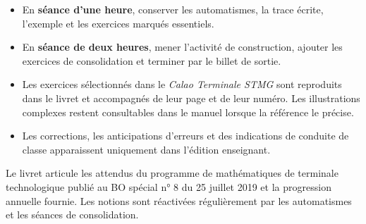 \documentclass[11pt,a4paper,openany]{book}
\begin{document}
\begin{itemize}
\item En \textbf{séance d'une heure}, conserver les automatismes, la trace écrite, l'exemple et les exercices marqués essentiels.
\item En \textbf{séance de deux heures}, mener l'activité de construction, ajouter les exercices de consolidation et terminer par le billet de sortie.
\item Les exercices sélectionnés dans le \emph{Calao Terminale STMG} sont reproduits dans le livret et accompagnés de leur page et de leur numéro. Les illustrations complexes restent consultables dans le manuel lorsque la référence le précise.
\item Les corrections, les anticipations d'erreurs et des indications de conduite de classe apparaissent uniquement dans l'édition enseignant.
\end{itemize}

\begin{retenir}
Le livret articule les attendus du programme de mathématiques de terminale technologique publié au BO spécial n° 8 du 25 juillet 2019 et la progression annuelle fournie. Les notions sont réactivées régulièrement par les automatismes et les séances de consolidation.
\end{retenir}

\tableofcontents
\mainmatter









\appendix




\end{document}
